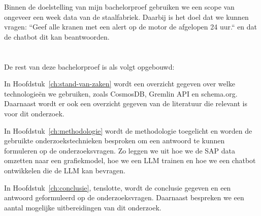 Binnen de doelstelling van mijn bachelorproef gebruiken we een scope van ongeveer een week data van de staalfabriek. 
Daarbij is het doel dat we kunnen vragen: ``Geef alle kranen met een alert op de motor de afgelopen 24 uur.`` en dat de chatbot dit kan beantwoorden.
\section{}%
\label{sec:opzet-bachelorproef}


De rest van deze bachelorproef is als volgt opgebouwd:

In Hoofdstuk~\ref{ch:stand-van-zaken} wordt een overzicht gegeven over welke technologieën we gebruiken, zoals CosmosDB, Gremlin API en schema.org.
Daarnaast wordt er ook een overzicht gegeven van de literatuur die relevant is voor dit onderzoek.

In Hoofdstuk~\ref{ch:methodologie} wordt de methodologie toegelicht en worden de gebruikte onderzoekstechnieken besproken om een antwoord te kunnen formuleren op de onderzoeksvragen.
Zo leggen we uit hoe we de SAP data omzetten naar een grafiekmodel, hoe we een LLM trainen en hoe we een chatbot ontwikkelen die de LLM kan bevragen.


In Hoofdstuk~\ref{ch:conclusie}, tenslotte, wordt de conclusie gegeven en een antwoord geformuleerd op de onderzoeksvragen. Daarnaast bespreken we een aantal mogelijke uitbereidingen van dit onderzoek.
